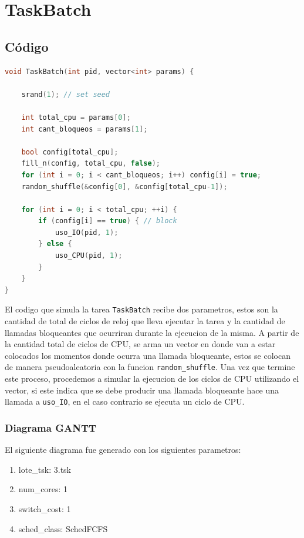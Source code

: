 \section{TaskBatch}

\subsection{Código}

\begin{lstlisting}[language=C++, breaklines=true]
void TaskBatch(int pid, vector<int> params) {

	srand(1); // set seed

	int total_cpu = params[0];
	int cant_bloqueos = params[1];

	bool config[total_cpu];
	fill_n(config, total_cpu, false);
	for (int i = 0; i < cant_bloqueos; i++) config[i] = true;
	random_shuffle(&config[0], &config[total_cpu-1]);

	for (int i = 0; i < total_cpu; ++i) {
		if (config[i] == true) { // block
			uso_IO(pid, 1);
		} else {
			uso_CPU(pid, 1);
		}
	}
}
\end{lstlisting}

El codigo que simula la tarea \texttt{TaskBatch} recibe dos parametros, estos son la cantidad de total de ciclos de reloj que lleva ejecutar la tarea y la cantidad de llamadas bloqueantes que ocurriran durante la ejecucion de la misma. A partir de la cantidad total de ciclos de CPU, se arma un vector en donde van a estar colocados los momentos donde ocurra una llamada bloqueante, estos se colocan de manera pseudoaleatoria con la funcion \texttt{random\_shuffle}. Una vez que termine este proceso, procedemos a simular la ejecucion de los ciclos de CPU utilizando el vector, si este indica que se debe producir una llamada bloqueante hace una llamada a \texttt{uso\_IO}, en el caso contrario se ejecuta un ciclo de CPU.

\subsubsection{Diagrama GANTT}

El siguiente diagrama fue generado con los siguientes parametros:

\begin{enumerate}
	\item lote\_tsk: 3.tsk
	\item num\_cores: 1
	\item switch\_cost: 1
	\item sched\_class: SchedFCFS
\end{enumerate}

